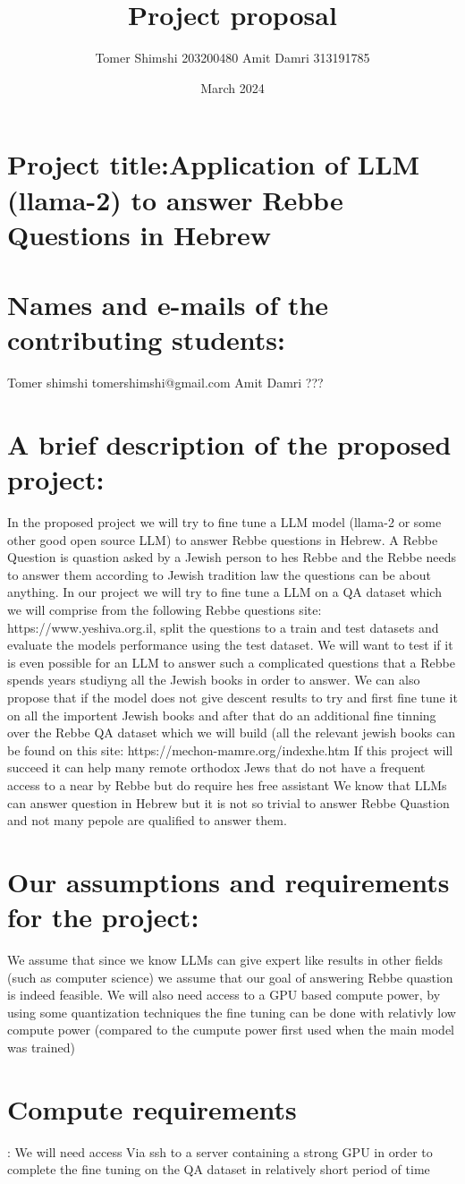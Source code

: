 \documentclass{article}
\title{Project proposal}
\author{Tomer Shimshi 203200480     Amit Damri 313191785 }
\date{March 2024}
\begin{document}
\maketitle

\section{Project title:Application of LLM (llama-2) to answer Rebbe Questions in Hebrew}

\section{Names and e-mails of the contributing students:}
Tomer shimshi tomershimshi@gmail.com
Amit Damri ???
\section{A brief description of the proposed project:}
In the proposed project we will try to fine tune a LLM model (llama-2 or some other good open source LLM) to answer Rebbe questions in Hebrew.
A Rebbe Question is quastion asked by a Jewish person to hes Rebbe and the Rebbe needs to answer them according to Jewish tradition law the questions can be about anything.
In our project we will try to fine tune a LLM on a QA dataset which we will comprise from the following Rebbe questions site: https://www.yeshiva.org.il, split the questions to a train and test datasets and evaluate the models performance using the test dataset. We will want to test if it is even possible for an LLM to answer such a complicated questions that a Rebbe spends years studiyng all the Jewish books in order to answer. We can also propose that if the model does not give descent results to try and first fine tune it on all the importent Jewish books and after that do an additional fine tinning over the Rebbe QA dataset which we will build (all the relevant jewish books can be found on this site: https://mechon-mamre.org/indexhe.htm
If this project will succeed it can help many remote orthodox Jews  that do not have a frequent access to a near by Rebbe but do require hes free assistant
We know that LLMs can answer question in Hebrew but it is not so trivial to answer Rebbe Quastion and not many pepole are qualified to answer them.
\section{Our assumptions  and requirements for the project:}
We assume that since we know LLMs can give expert like results in other fields (such as computer science) we assume that our goal of answering Rebbe quastion is indeed feasible.
We will also need access to a GPU based compute power, by using some quantization techniques the fine tuning can be done with relativly low compute power (compared to the cumpute power first used when the main model was trained)
\section{Compute requirements}:
We will need access Via ssh to a server containing a strong GPU in order to complete the fine tuning on the QA dataset in relatively short period of time
\end{document}
